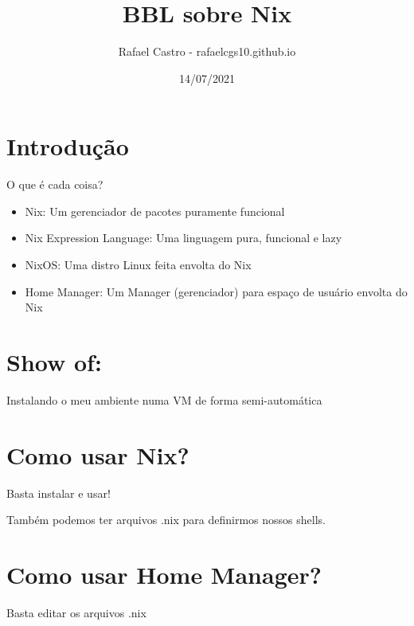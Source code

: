 \documentclass[presentation]{beamer}
\author{Rafael Castro - rafaelcgs10.github.io}
\date{14/07/2021}
\title{BBL sobre Nix}
\begin{document}
\maketitle

\section{Introdução}
\label{sec:org1a7a150}

\begin{frame}[label={sec:org8cac701}]{O que é cada coisa?}
\begin{itemize}
\item Nix: Um gerenciador de pacotes \alert{puramente funcional}
\item Nix Expression Language: Uma linguagem pura, funcional e lazy
\item NixOS: Uma distro Linux feita envolta do Nix
\item Home Manager: Um Manager (gerenciador) para espaço de usuário envolta do Nix
\end{itemize}
\end{frame}

\section{Show of:}
\label{sec:org56f994e}

\begin{frame}[label={sec:org4da9829}]{Instalando o meu ambiente numa VM de forma semi-automática}
\end{frame}

\section{Como usar Nix?}
\label{sec:org9e199a3}

\begin{frame}[label={sec:orgd468595}]{Basta instalar e usar!}
\end{frame}

\begin{frame}[label={sec:org8f6df4d}]{Também podemos ter arquivos .nix para definirmos nossos shells.}
\end{frame}

\section{Como usar Home Manager?}
\label{sec:org7b50b4d}

\begin{frame}[label={sec:org79836db}]{Basta editar os arquivos .nix}
\end{frame}
\end{document}
